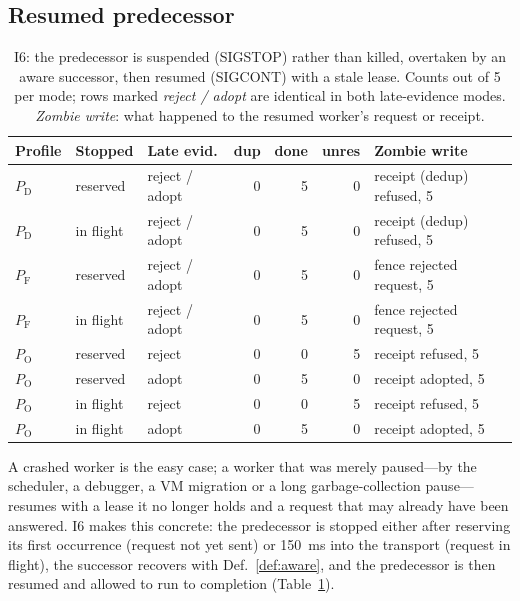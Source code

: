 \documentclass[conference,10pt]{IEEEtran}
\newcommand{\PD}{P_{\mathrm{D}}}
\newcommand{\PF}{P_{\mathrm{F}}}
\newcommand{\PO}{P_{\mathrm{O}}}
\begin{document}
\subsection{Resumed predecessor}\label{sec:results-i6}
\begin{table}[t]
\centering\footnotesize
\caption{I6: the predecessor is suspended (SIGSTOP) rather than killed, overtaken by an aware successor, then resumed (SIGCONT) with a stale lease. Counts out of 5 per mode; rows marked \emph{reject / adopt} are identical in both late-evidence modes. \emph{Zombie write}: what happened to the resumed worker's request or receipt.}
\label{tab:i6}
\setlength{\tabcolsep}{2.5pt}
\begin{tabular}{@{}lllrrrl@{}}
\toprule
Profile & Stopped & Late evid. & dup & done & unres & Zombie write\\
\midrule
$\PD$ & reserved & reject / adopt & 0 & 5 & 0 & receipt (dedup) refused, 5\\
$\PD$ & in flight & reject / adopt & 0 & 5 & 0 & receipt (dedup) refused, 5\\
$\PF$ & reserved & reject / adopt & 0 & 5 & 0 & fence rejected request, 5\\
$\PF$ & in flight & reject / adopt & 0 & 5 & 0 & fence rejected request, 5\\
$\PO$ & reserved & reject & 0 & 0 & 5 & receipt refused, 5\\
$\PO$ & reserved & adopt & 0 & 5 & 0 & receipt adopted, 5\\
$\PO$ & in flight & reject & 0 & 0 & 5 & receipt refused, 5\\
$\PO$ & in flight & adopt & 0 & 5 & 0 & receipt adopted, 5\\
\bottomrule
\end{tabular}
\end{table}
A crashed worker is the easy case; a worker that was merely paused---by the scheduler, a debugger, a VM migration or a long garbage-collection pause---resumes with a lease it no longer holds and a request that may already have been answered. I6 makes this concrete: the predecessor is stopped either after reserving its first occurrence (request not yet sent) or 150~ms into the transport (request in flight), the successor recovers with Def.~\ref{def:aware}, and the predecessor is then resumed and allowed to run to completion (Table~\ref{tab:i6}).
\end{document}
